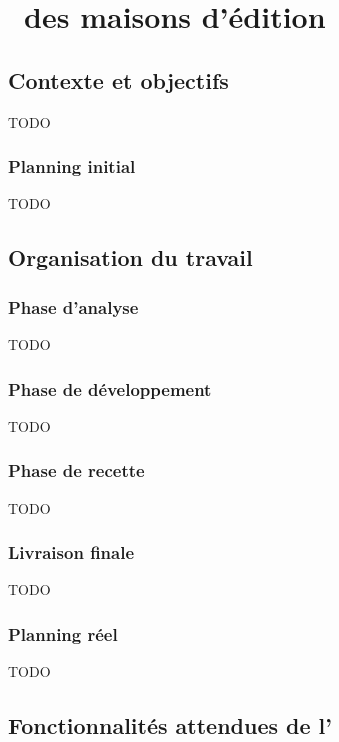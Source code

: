 \section{\aintranet\ des maisons d'édition \aey}

\subsection{Contexte et objectifs}

TODO

\subsubsection{Planning initial}

TODO

\subsection{Organisation du travail}

\subsubsection{Phase d'analyse}

TODO

\subsubsection{Phase de développement}

TODO

\subsubsection{Phase de recette}

TODO

\subsubsection{Livraison finale}

TODO

\subsubsection{Planning réel}

TODO

\subsection{Fonctionnalités attendues de l'\aintranet}
\label{section:eyrolles_fct}


